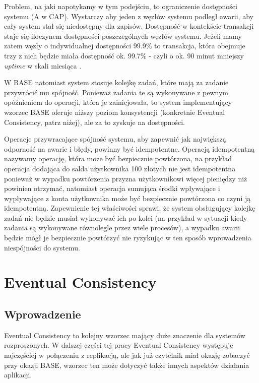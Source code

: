 Problem, na jaki napotykamy w tym podejściu, to ograniczenie dostępności systemu (A w CAP).
Wystarczy aby jeden z węzłów systemu podległ awarii, aby cały system stał się niedostępny dla zapisów.
Dostępność w kontekście transakcji staje się iloczynem dostępności poszczególnych węzłów systemu.
Jeżeli mamy zatem węzły o indywidualnej dostępności 99.9\% to transakcja, która obejmuje trzy z nich będzie miała dostępność ok. 99.7\% - czyli o ok. 90 minut mniejszy \emph{uptime} w skali miesiąca \cite{base-an-acid-alternative}.

W BASE natomiast system stosuje kolejkę zadań, które mają za zadanie przywrócić mu spójność.
Ponieważ zadania te są wykonywane z pewnym opóźnieniem do operacji, która je zainicjowała, to system implementujący wzorzec BASE oferuje niższy poziom konsystencji (konkretnie Eventual Consistency, patrz niżej), ale za to zyskuje na dostępności.

Operacje przywracające spójność systemu, aby zapewnić jak największą odporność na awarie i błędy, powinny być idempotentne.
Operacją idempotentną nazywamy operację, która może być bezpiecznie powtórzona, na przykład operacja dodająca do salda użytkownika 100 złotych nie jest idempotentna ponieważ w wypadku powtórzenia przyzna użytkownikowi więcej pieniędzy niż powinien otrzymać, natomiast operacja sumująca środki wpływające i wypływające z konta użytkownika może być bezpiecznie powtórzona co czyni ją idempotentną.
Zapewnienie tej właściwości sprawi, że system obsługujący kolejkę zadań nie będzie musiał wykonywać ich po kolei (na przykład w sytuacji kiedy zadania są wykonywane równolegle przez wiele procesów), a wypadku awarii będzie mógł je bezpiecznie powtórzyć nie ryzykując w ten sposób wprowadzenia niespójności do systemu.

\section{Eventual Consistency}

\subsection*{Wprowadzenie}

Eventual Consistency to kolejny wzorzec mający duże znaczenie dla systemów rozproszonych.
W dalszej części tej pracy Eventual Consistency występuje najczęściej w połączeniu z replikacją, ale jak już czytelnik miał okazję zobaczyć przy okazji BASE, wzorzec ten może dotyczyć także innych aspektów działania aplikacji.


